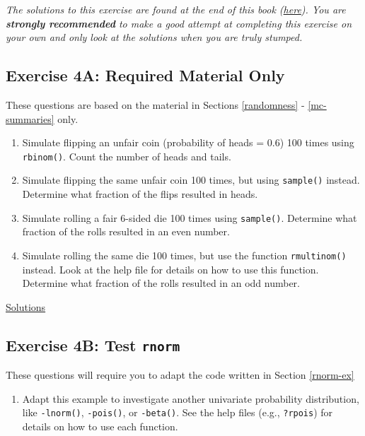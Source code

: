 \documentclass[]{book}
\providecommand{\tightlist}{%
  \setlength{\itemsep}{0pt}\setlength{\parskip}{0pt}}
\begin{document}
\emph{The solutions to this exercise are found at the end of this book (\protect\hyperlink{ex4a-answers}{here}). You are \textbf{strongly recommended} to make a good attempt at completing this exercise on your own and only look at the solutions when you are truly stumped.}

\hypertarget{exercise-4a-required-material-only}{%
\subsection*{Exercise 4A: Required Material Only}\label{exercise-4a-required-material-only}}

These questions are based on the material in Sections \ref{randomness} - \ref{mc-summaries} only.

\begin{enumerate}
\def\labelenumi{\arabic{enumi}.}
\tightlist
\item
  Simulate flipping an unfair coin (probability of heads = 0.6) 100 times using \texttt{rbinom()}. Count the number of heads and tails.
\item
  Simulate flipping the same unfair coin 100 times, but using \texttt{sample()} instead. Determine what fraction of the flips resulted in heads.
\item
  Simulate rolling a fair 6-sided die 100 times using \texttt{sample()}. Determine what fraction of the rolls resulted in an even number.
\item
  Simulate rolling the same die 100 times, but use the function \texttt{rmultinom()} instead. Look at the help file for details on how to use this function. Determine what fraction of the rolls resulted in an odd number.
\end{enumerate}

\protect\hyperlink{ex4a-answers}{Solutions}

\hypertarget{exercise-4b-test-rnorm}{%
\subsection*{\texorpdfstring{Exercise 4B: Test \texttt{rnorm}}{Exercise 4B: Test rnorm}}\label{exercise-4b-test-rnorm}}

These questions will require you to adapt the code written in Section \ref{rnorm-ex}

\begin{enumerate}
\def\labelenumi{\arabic{enumi}.}
\tightlist
\item
  Adapt this example to investigate another univariate probability distribution, like \texttt{-lnorm()}, \texttt{-pois()}, or \texttt{-beta()}. See the help files (e.g., \texttt{?rpois}) for details on how to use each function.
\end{enumerate}
\end{document}
